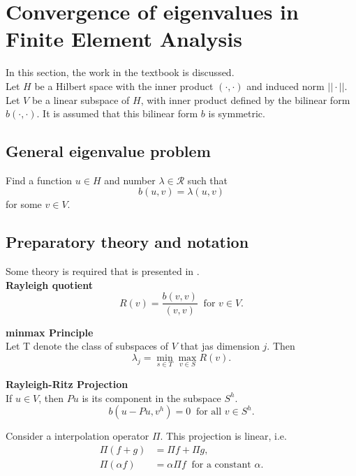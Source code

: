 \documentclass[../../main.tex]{subfiles}
\begin{document}
\section{Convergence of eigenvalues in Finite Element Analysis}
In this section, the work in the textbook \cite[p.228-236]{SF73} is discussed.\\

Let $H$ be a Hilbert space with the inner product $(\cdot,\cdot)$ and induced norm $||\cdot||$. Let $V$ be a linear subspace of $H$, with inner product defined by the bilinear form $b(\cdot,\cdot)$. It is assumed that this bilinear form $b$ is symmetric.

\subsection{General eigenvalue problem}
Find a function $u \in H$ and number $\lambda \in \mathcal{R}$ such that
\begin{equation}
	b(u,v) = \lambda (u,v) \label{GEVP}
\end{equation} for some $v \in V$.

\subsection{Preparatory theory and notation}
Some theory is required that is presented in \cite{SF73}.\\

\textbf{Rayleigh quotient}
\begin{equation*}
	R(v) = \frac{b(v,v)}{(v,v)} \ \text { for } v \in V.
\end{equation*}

\textbf{minmax Principle}\\
Let T denote the class of subspaces of $V$ that jas dimension $j$. Then
\begin{equation*}
	\lambda_j = \min_{s\in T}\max_{v \in S} R(v).
\end{equation*}

\textbf{Rayleigh-Ritz Projection}\\
If $u \in V$, then $Pu$ is its component in the subspace $S^h$.
\begin{equation*}
	b(u-Pu,v^h) = 0 \ \text{ for all } v \in S^h.
\end{equation*}

Consider a interpolation operator $\Pi$. This projection is linear, i.e.
\begin{align*}
	\Pi(f + g) & = \Pi f + \Pi g,\\
	\Pi(\alpha f) & = \alpha \Pi f \ \text{ for a constant } \alpha. 
\end{align*}
\end{document}
